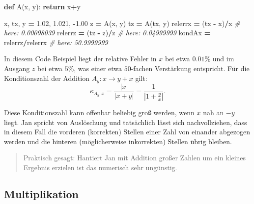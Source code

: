 \documentclass[
]{book}
\newenvironment{Shaded}{\begin{snugshade}}{\end{snugshade}}
\newcommand{\CommentTok}[1]{\textcolor[rgb]{0.56,0.35,0.01}{\textit{#1}}}
\newcommand{\ControlFlowTok}[1]{\textcolor[rgb]{0.13,0.29,0.53}{\textbf{#1}}}
\newcommand{\FloatTok}[1]{\textcolor[rgb]{0.00,0.00,0.81}{#1}}
\newcommand{\KeywordTok}[1]{\textcolor[rgb]{0.13,0.29,0.53}{\textbf{#1}}}
\newcommand{\NormalTok}[1]{#1}
\newcommand{\OperatorTok}[1]{\textcolor[rgb]{0.81,0.36,0.00}{\textbf{#1}}}
\newenvironment {JHSAYS} [0] {\begin{quote}\color{jhsc}} {\end{quote}}
\theoremstyle{definition}
\theoremstyle{definition}
\theoremstyle{definition}
\theoremstyle{definition}
\theoremstyle{remark}
\begin{document}
\begin{Shaded}
\begin{Highlighting}[]
\KeywordTok{def}\NormalTok{ A(x, y):}
    \ControlFlowTok{return}\NormalTok{ x}\OperatorTok{+}\NormalTok{y}

\NormalTok{x, tx, y }\OperatorTok{=} \FloatTok{1.02}\NormalTok{, }\FloatTok{1.021}\NormalTok{, }\OperatorTok{{-}}\FloatTok{1.00}
\NormalTok{z }\OperatorTok{=}\NormalTok{ A(x, y)}
\NormalTok{tz }\OperatorTok{=}\NormalTok{ A(tx, y)}
\NormalTok{relerrx }\OperatorTok{=}\NormalTok{ (tx }\OperatorTok{{-}}\NormalTok{ x)}\OperatorTok{/}\NormalTok{x        }\CommentTok{\# here: 0.00098039}
\NormalTok{relerrz }\OperatorTok{=}\NormalTok{ (tz }\OperatorTok{{-}}\NormalTok{ z)}\OperatorTok{/}\NormalTok{z        }\CommentTok{\# here: 0.04999999}
\NormalTok{kondAx }\OperatorTok{=}\NormalTok{ relerrz}\OperatorTok{/}\NormalTok{relerrx    }\CommentTok{\# here: 50.9999999}
\end{Highlighting}
\end{Shaded}

In diesem Code Beispiel liegt der relative Fehler in \(x\) bei etwa \(0.01\)\% und im Ausgang \(z\) bei etwa \(5\)\%, was einer etwa \(50\)-fachen Verstärkung entspricht.
Für die Konditionszahl der Addition \(A_y\colon x \to y+x\) gilt:
\begin{equation*}
\kappa_{A_y;x} = \frac{|x|}{|x+y|} = \frac{1}{|1+\frac{y}{x}|}.
\end{equation*}

Diese Konditionszahl kann offenbar beliebig groß werden, wenn \(x\) nah an \(-y\) liegt. Jan spricht von Auslöschung und tatsächlich lässt sich nachvollziehen, dass in diesem Fall die vorderen (korrekten) Stellen einer Zahl von einander abgezogen werden und die hinteren (möglicherweise inkorrekten) Stellen übrig bleiben.

\leavevmode{}%
\begin{JHSAYS}
Praktisch gesagt: Hantiert Jan mit Addition großer Zahlen um ein kleines Ergebnis erzielen ist das numerisch sehr ungünstig.

\end{JHSAYS}

\hypertarget{multiplikation}{%
\subsection{Multiplikation}\label{multiplikation}}
\end{document}
